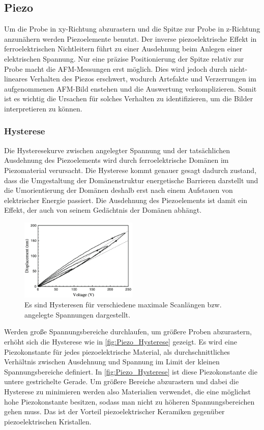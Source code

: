 \subsection{Piezo}
\label{sec:piezo}
    Um die Probe in xy-Richtung abzurastern und die Spitze zur Probe in z-Richtung anzunähern werden Piezoelemente benutzt.
    Der inverse piezoelektrische Effekt in ferroelektrischen Nichtleitern führt zu einer Ausdehnung beim Anlegen einer elektrischen Spannung.
    Nur eine präzise Positionierung der Spitze relativ zur Probe macht die AFM-Messungen erst möglich.
    Dies wird jedoch durch nicht-lineares Verhalten des Piezos erschwert, wodurch Artefakte und Verzerrungen im aufgenommenen AFM-Bild enstehen und die Auswertung verkomplizieren.
    Somit ist es wichtig die Ursachen für solches Verhalten zu identifizieren, um die Bilder interpretieren zu können.
    
    \subsubsection*{Hysterese} \vspace*{-0.25cm}
        Die Hysteresekurve zwischen angelegter Spannung und der tatsächlichen Ausdehnung des Piezoelements wird durch ferroelektrische Domänen im Piezomaterial verursacht.
        Die Hysterese kommt genauer gesagt dadurch zustand, dass die Umgestaltung der Domänenstruktur energetische Barrieren darstellt und die Umorientierung der Domänen deshalb erst nach einem Aufstauen von elektrischer Energie passiert.
        Die Ausdehnung des Piezoelements ist damit ein Effekt, der auch von seinem Gedächtnis der Domänen abhängt.
        \begin{figure}[ht]
            \centering\captionsetup{format=plain}
            \includegraphics[width=0.5\textwidth]{bilder/Piezo_Hysterese.png}
            \caption{Es sind Hysteresen für verschiedene maximale Scanlängen bzw. angelegte Spannungen dargestellt.}
            \label{fig:Piezo_Hysterese}
        \end{figure}
        Werden große Spannungsbereiche durchlaufen, um größere Proben abzurastern, erhöht sich die Hysterese wie in \autoref{fig:Piezo_Hysterese} gezeigt.
        Es wird eine Piezokonstante für jedes piezoelektrische Material, als durchschnittliches Verhältnis zwischen Ausdehnung und Spannung im Limit der kleinen Spannungsbereiche definiert.
        In \autoref{fig:Piezo_Hysterese} ist diese Piezokonstante die untere gestrichelte Gerade.
        Um größere Bereiche abzurastern und dabei die Hysterese zu minimieren werden also Materialien verwendet, die eine möglichst hohe Piezokonstante besitzen, sodass man nicht zu höheren Spannungsbereichen gehen muss.
        Das ist der Vorteil piezoelektrischer Keramiken gegenüber piezoelektrischen Kristallen.      

